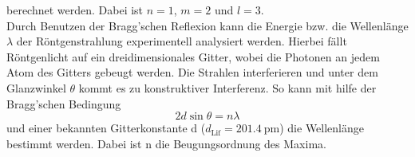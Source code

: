 berechnet werden. Dabei ist $n=1$, $m=2$ und $l=3$.
\\
Durch Benutzen der Bragg'schen Reflexion kann die Energie bzw. die Wellenlänge $\lambda$ der Röntgenstrahlung experimentell analysiert werden.
Hierbei fällt Röntgenlicht auf ein dreidimensionales Gitter, wobei die Photonen an jedem Atom des Gitters gebeugt werden. Die Strahlen interferieren und unter dem Glanzwinkel $\theta$ 
kommt es zu konstruktiver Interferenz. So kann mit hilfe der Bragg'schen Bedingung
\begin{equation}
    2 d \sin \theta = n \lambda
    \label{eqn:bragg}
\end{equation}
und einer bekannten Gitterkonstante d ($d_\text{Lif}=\SI{201.4}{\pico \metre}$) die Wellenlänge bestimmt werden. Dabei ist n die Beugungsordnung des Maxima.


